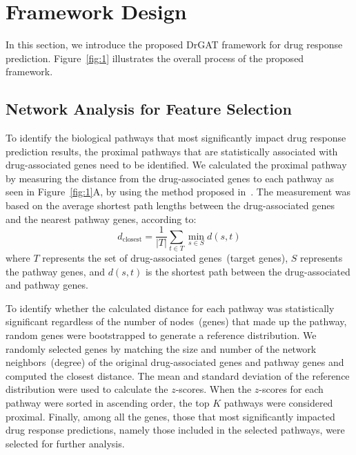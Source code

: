 \documentclass[runningheads]{llncs}
\newcommand{\drdiff}{DrGAT\xspace}
\begin{document}
\section{Framework Design}

In this section, we introduce the proposed \drdiff framework for drug response prediction. Figure~\ref{fig:1} illustrates the overall process of the proposed framework.

\subsection{Network Analysis for Feature Selection}\label{sec:network}

To identify the biological pathways that most significantly impact drug response prediction results, the proximal pathways that are statistically associated with drug-associated genes need to be identified. We calculated the proximal pathway by measuring the distance from the drug-associated genes to each pathway as seen in Figure~\ref{fig:1}A, by using the method proposed in~\cite{14}. The measurement was based on the average shortest path lengths between the drug-associated genes and the nearest pathway genes, according to:
%
\begin{equation}
d_{\text{closest}} = \frac{1}{|T|} \sum_{t \in T} \min_{s \in S} d(s,t)
\end{equation}
%
where $T$ represents the set of drug-associated genes~(target genes), $S$ represents the pathway genes, and $d(s, t)$ is the shortest path
between the drug-associated and pathway genes. 

To identify whether the calculated distance for each pathway was statistically significant regardless of the number of nodes~(genes) that made up the pathway, random genes were bootstrapped to generate a reference distribution. We randomly selected genes by matching the size and number of the network neighbors~(degree) of the original drug-associated genes and pathway genes and computed the closest distance. The mean and standard deviation of the reference distribution were used to calculate the $z$-scores. When the $z$-scores for each pathway were sorted in ascending order, the top $K$ pathways were considered proximal. Finally, among all the genes, those that
most significantly impacted drug response predictions, namely those
included in the selected pathways, were selected for further analysis.

\end{document}
